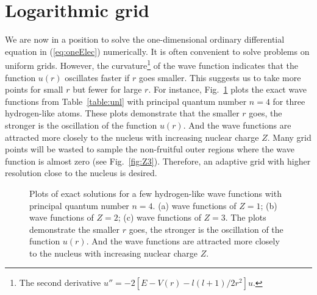 \section{Logarithmic grid}
We are now in a position to solve the one-dimensional ordinary differential
equation in (\ref{eq:oneElec}) numerically. It is often convenient to solve
problems on uniform grids. However, the curvature\footnote{The second derivative
$u'' = -2[E-V(r)-l(l+1)/2r^2]u$.} of the wave function
indicates that the function $u(r)$ oscillates faster if $r$ goes smaller.
This suggests us to take more points for small $r$ but fewer for large $r$.
For instance, Fig.~\ref{fig:hydrlike} plots the exact wave functions from Table~\ref{table:unl} with
principal quantum number $n=4$ for three hydrogen-like atoms. These plots demonstrate
that the smaller $r$ goes, the stronger is the oscillation of the function $u(r)$.
And the wave functions are attracted more closely to the nucleus with increasing
nuclear charge $Z$. Many grid points will be wasted to sample the non-fruitful outer
regions where the wave function is almost zero (see Fig.~\ref{fig:Z3}). Therefore, an
adaptive grid with higher resolution close to the nucleus is desired.

\begin{figure}[h!]
\centering
\subfloat[][$Z=1$]{\texttt{[image: Z1]}\label{fig:Z1}}
\subfloat[][$Z=2$]{\texttt{[image: Z2]}\label{fig:Z2}}
\subfloat[][$Z=3$]{\texttt{[image: Z3]}\label{fig:Z3}}
\caption{Plots of exact solutions for a few hydrogen-like wave functions with
principal quantum number $n=4$. (a) wave functions of $Z=1$; (b) wave functions of $Z=2$;
(c) wave functions of $Z=3$. The plots demonstrate the smaller $r$ goes,
the stronger is the oscillation of the function $u(r)$. And the wave functions
are attracted more closely to the nucleus with increasing nuclear charge $Z$.}
\label{fig:hydrlike}
\end{figure}

